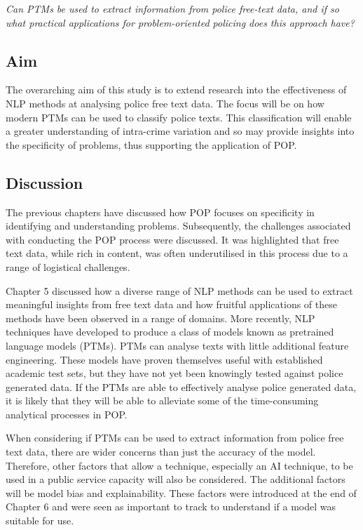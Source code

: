 \emph{Can PTMs be used to extract information from police free-text data, and if so what practical applications for problem-oriented policing does this approach have?}

\subsection{Aim} 

The overarching aim of this study is to extend research into the effectiveness of NLP methods at analysing police free text data. The focus will be on how modern PTMs can be used to classify police texts. This classification will enable a greater understanding of intra-crime variation and so may provide  insights into the specificity of problems, thus supporting the application of POP.

\subsection{Discussion} 

The previous chapters have discussed how POP focuses on specificity in identifying and understanding problems. Subsequently, the challenges associated with conducting the POP process were discussed. It was highlighted that free text data, while rich in content, was often underutilised in this process due to a range of logistical challenges.

Chapter 5 discussed how a diverse range of NLP methods can be used to extract meaningful insights from free text data and how fruitful applications of these methods have been observed in a range of domains. More recently, NLP techniques have developed to produce a class of models known as pretrained language models (PTMs). PTMs can analyse texts with little additional feature engineering. These models have proven themselves useful with established academic test sets, but they have not yet been knowingly tested against police generated data. If the PTMs are able to effectively analyse police generated data, it is likely that they will be able to alleviate some of the time-consuming analytical processes in POP.

When considering if PTMs can be used to extract information from police free text data, there are wider concerns than just the accuracy of the model. Therefore, other factors that allow a technique, especially an AI technique, to be used in a public service capacity will also be considered. The additional factors will be model bias and explainability. These factors were introduced at the end of Chapter 6 and were seen as important to track to understand if a model was suitable for use.

